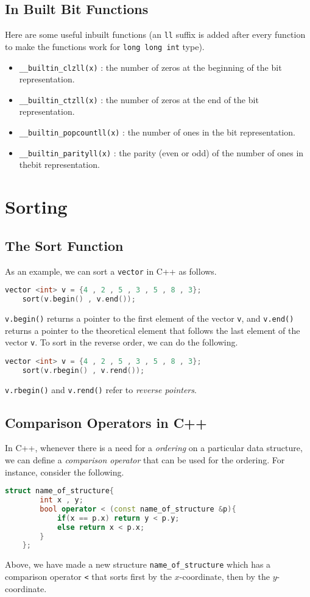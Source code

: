 \documentclass[12pt,a4paper]{amsart}
\numberwithin{equation}{section}
\theoremstyle{definition}
\begin{document}
\subsection{In Built Bit Functions} Here are some useful inbuilt functions (an \verb|ll| suffix is added after every function to make the functions work for \verb|long long int| type). 

\begin{itemize}
    \item \verb|__builtin_clzll(x)| : the number of zeros at the beginning of the bit representation.
    \item \verb|__builtin_ctzll(x)| : the number of zeros at the end of the bit representation.
    \item \verb|__builtin_popcountll(x)| : the number of ones in the bit representation.
    \item \verb|__builtin_parityll(x)| : the parity (even or odd) of the number of ones in thebit representation.
\end{itemize}

\section{Sorting}
\subsection{The Sort Function} As an example, we can sort a \verb|vector| in C++ as follows. 
\begin{lstlisting}[language=C++]
    vector <int> v = {4 , 2 , 5 , 3 , 5 , 8 , 3};
    sort(v.begin() , v.end());
\end{lstlisting}
\verb|v.begin()| returns a pointer to the first element of the vector \verb|v|, and \verb|v.end()| returns a pointer to the theoretical element that follows the last element of the vector \verb|v|. To sort in the reverse order, we can do the following. 
\begin{lstlisting}[language=C++]
    vector <int> v = {4 , 2 , 5 , 3 , 5 , 8 , 3};
    sort(v.rbegin() , v.rend());
\end{lstlisting}
\verb|v.rbegin()| and \verb|v.rend()| refer to \textit{reverse pointers}. 

\subsection{Comparison Operators in C++} In C++, whenever there is a need for a \textit{ordering} on a particular data structure, we can define a \textit{comparison operator} that can be used for the ordering. For instance, consider the following. 
\begin{lstlisting}[language=C++]
    struct name_of_structure{
        int x , y;
        bool operator < (const name_of_structure &p){
            if(x == p.x) return y < p.y;
            else return x < p.x;
        }
    };
\end{lstlisting}
Above, we have made a new structure \verb|name_of_structure| which has a comparison operator \verb|<| that sorts first by the $x$-coordinate, then by the $y$-coordinate.
\end{document}
